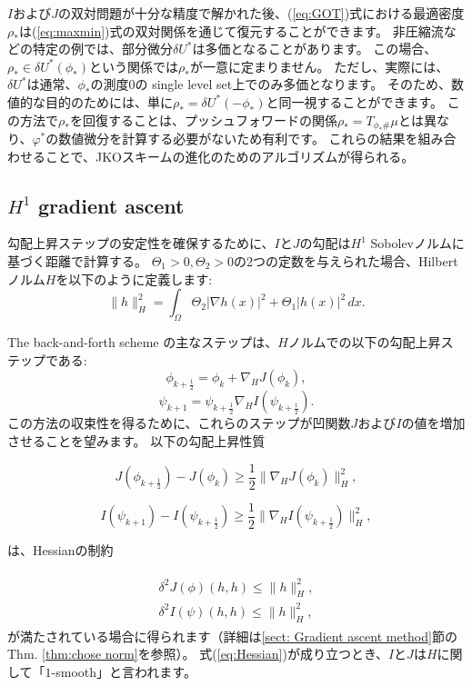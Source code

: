 \documentclass{jsarticle}
\theoremstyle{definition}
\begin{document}
{\color{red}
$I$および$J$の双対問題が十分な精度で解かれた後、(\ref{eq:GOT})式における最適密度\(\rho_*\)は(\ref{eq:maxmin})式の双対関係を通じて復元することができます。
非圧縮流などの特定の例では、部分微分\(\delta U^*\)は多価となることがあります。
この場合、\(\rho_* \in \delta U^*(\phi_*)\)という関係では\(\rho_*\)が一意に定まりません。
ただし、実際には、\(\delta U^*\)は通常、\(\phi_*\)の測度$0$の single level set上でのみ多価となります。
そのため、数値的な目的のためには、単に\(\rho_* = \delta U^*(- \phi_*)\)と同一視することができます。
この方法で\(\rho_*\)を回復することは、プッシュフォワードの関係\(\rho_* = T_{\phi_* \# }\mu\)とは異なり、\(\varphi^*\)の数値微分を計算する必要がないため有利です。
}
これらの結果を組み合わせることで、JKOスキームの進化のためのアルゴリズムが得られる。

\subsection{$H^1$ gradient ascent}
\label{sect $H^1$ gradient ascent}

勾配上昇ステップの安定性を確保するために、$I$と$J$の勾配は$H^1$ Sobolevノルムに基づく距離で計算する。
$\Theta_1 > 0, \Theta_2 > 0$の$2$つの定数を与えられた場合、Hilbertノルム$H$を以下のように定義します:
\begin{equation}
    \label{eq:Hilbertノルム}
    \|h\|_H^2 = \int_\Omega \Theta_2 |\nabla h(x)|^2 + \Theta_1 |h(x)|^2 \, dx.
\end{equation}

The back-and-forth scheme の主なステップは、$H$ノルムでの以下の勾配上昇ステップである:
\[
    \phi_{k + \frac{1}{2}} = \phi_k + \nabla_H J(\phi_k),
\]
\[
    \psi_{k+1} = \psi_{k + \frac{1}{2}} \nabla_H I(\psi_{k + \frac{1}{2}}).
\]
この方法の収束性を得るために、これらのステップが凹関数$J$および$I$の値を増加させることを望みます。
以下の勾配上昇性質

\[
    J(\phi_{k + \frac{1}{2}}) - J(\phi_k) \geq \frac{1}{2}\|\nabla_H J(\phi_k)\|_H^2,
\]

\[
    I(\psi_{k+1}) - I(\psi_{k + \frac{1}{2}}) \geq \frac{1}{2}\|\nabla_H I(\psi_{k + \frac{1}{2}})\|_H^2,
\]

は、Hessianの制約

\begin{align}
    \label{eq:Hessian}
    \begin{split}
        \delta^2 J(\phi)(h,h) \leq \|h\|_H^2,\\
        \delta^2 I(\psi)(h,h) \leq \|h\|_H^2,
    \end{split}
\end{align}
が満たされている場合に得られます（詳細は\ref{sect: Gradient ascent method}節のThm. \ref{thm:chose norm}を参照）。
式(\ref{eq:Hessian})が成り立つとき、$I$と$J$は$H$に関して「$1$-smooth」と言われます。\\
\end{document}
